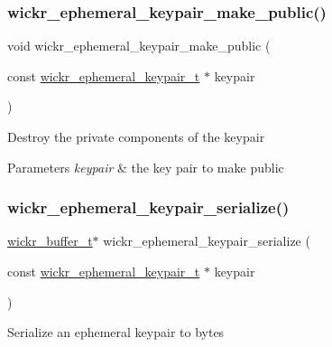 \subsubsection{\texorpdfstring{wickr\+\_\+ephemeral\+\_\+keypair\+\_\+make\+\_\+public()}{wickr\_ephemeral\_keypair\_make\_public()}}
{\footnotesize\ttfamily void wickr\+\_\+ephemeral\+\_\+keypair\+\_\+make\+\_\+public (\begin{DoxyParamCaption}\item[{const \mbox{\hyperlink{structwickr__ephemeral__keypair}{wickr\+\_\+ephemeral\+\_\+keypair\+\_\+t}} $\ast$}]{keypair }\end{DoxyParamCaption})}

Destroy the private components of the keypair


\begin{DoxyParams}{Parameters}
{\em keypair} & the key pair to make public \\
\hline
\end{DoxyParams}
\mbox{\label{group__wickr__ephemeral__keypair_ga1c994a08f270cc84088263d48a4b3636}} 
\subsubsection{\texorpdfstring{wickr\+\_\+ephemeral\+\_\+keypair\+\_\+serialize()}{wickr\_ephemeral\_keypair\_serialize()}}
{\footnotesize\ttfamily \mbox{\hyperlink{structwickr__buffer}{wickr\+\_\+buffer\+\_\+t}}$\ast$ wickr\+\_\+ephemeral\+\_\+keypair\+\_\+serialize (\begin{DoxyParamCaption}\item[{const \mbox{\hyperlink{structwickr__ephemeral__keypair}{wickr\+\_\+ephemeral\+\_\+keypair\+\_\+t}} $\ast$}]{keypair }\end{DoxyParamCaption})}

Serialize an ephemeral keypair to bytes



